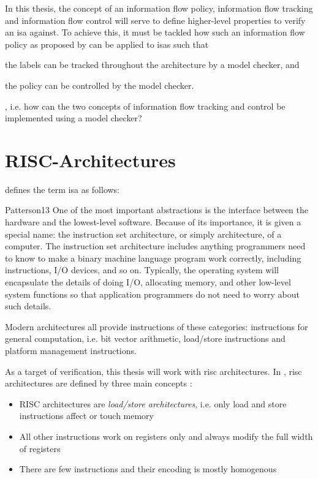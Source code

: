 In this thesis, the concept of an information flow policy, information flow tracking and information flow control will serve to define higher-level properties to verify an \gls{isa} against.
To achieve this, it must be tackled how such an information flow policy as proposed by \citeauthor{Ferraiuolo17} can be applied to \glspl{isa} such that \begin{enumerate*}[label=\alph*)]
    \item the labels can be tracked throughout the architecture by a model checker, and
    \item the policy can be controlled by the model checker.
\end{enumerate*}, i.e. how can the two concepts of information flow tracking and control be implemented using a model checker?

\section{RISC-Architectures}
\label{sec:riscs}

 defines the term \gls{isa} as follows:

\begin{displaycquote}[p.22]{Patterson13}
    One of the most important abstractions  is the interface between the hardware and the lowest-level software.
    Because of its importance, it is given a special name: the instruction set architecture, or simply architecture, of a computer.
    The instruction set architecture includes anything programmers need to know to make a binary machine language program work correctly, including instructions, I/O devices, and so on.
    Typically, the operating system will encapsulate the details of doing I/O, allocating memory, and other low-level system functions so that application programmers do not need to worry about such details.
\end{displaycquote}

Modern architectures all provide instructions of these categories: instructions for general computation, i.e. bit vector arithmetic, load/store instructions and platform management instructions.

As a target of verification, this thesis will work with \gls{risc} architectures.
In , \gls{risc} architectures are defined by three main concepts \cite[p.C-4]{Hennessy12}:
\begin{itemize}
    \item RISC architectures are \textit{load/store architectures}, i.e. only load and store instructions affect or touch memory
    \item All other instructions work on registers only and always modify the full width of registers
    \item There are few instructions and their encoding is mostly homogenous
\end{itemize}

